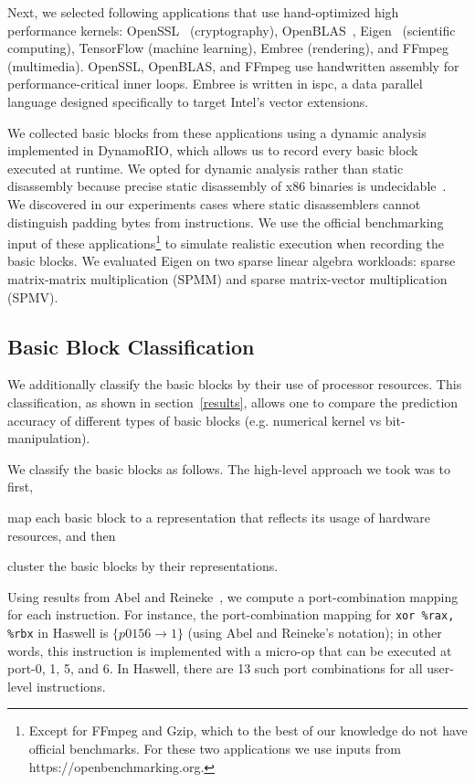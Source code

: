 Next, we selected following applications that use hand-optimized high performance kernels:
OpenSSL~\cite{openssl} (cryptography), OpenBLAS~\cite{openblas}, Eigen~\cite{eigen} (scientific computing),
TensorFlow\cite{tensorflow} (machine learning),
Embree\cite{embree} (rendering), and FFmpeg (multimedia).
OpenSSL, OpenBLAS, and FFmpeg use handwritten assembly for performance-critical inner loops.
Embree is written in ispc\cite{ispc}, a data parallel language
designed specifically to target Intel's vector extensions.

We collected basic blocks from these applications using
a dynamic analysis implemented in DynamoRIO\cite{dynamorio},
which allows us to record every basic block
executed at runtime.
We opted for dynamic analysis rather than static disassembly
because precise static disassembly of x86 binaries
is undecidable~\cite{disassembly-undecidable}.
We discovered in our experiments cases where
static disassemblers cannot distinguish padding bytes from instructions.
We use the official benchmarking input of these applications\footnote{
Except for FFmpeg and Gzip, which to the best of our knowledge do not have
official benchmarks. For these two applications we use inputs
from https://openbenchmarking.org.
} to simulate realistic execution when recording the basic blocks.
We evaluated Eigen on two sparse linear algebra workloads:
sparse matrix-matrix multiplication (SPMM) and 
sparse matrix-vector multiplication (SPMV).

\subsection{Basic Block Classification}\label{classification}
We additionally classify the basic blocks by their use of processor resources.
This classification, as shown in section~\ref{results},
allows one to compare the prediction accuracy of different types of basic blocks 
(e.g. numerical kernel vs bit-manipulation).

We classify the basic blocks as follows.
The high-level approach we took was to first,
\begin{enumerate*}
\item map each basic block to a representation
that reflects its usage of hardware resources, and then
\item cluster the basic blocks by their representations.
\end{enumerate*}

Using results from Abel and Reineke~\cite{uops},
we compute a port-combination mapping for each instruction.
For instance,
the port-combination mapping for \verb|xor %rax, %rbx| in Haswell
is $\{ p0156 \rightarrow 1 \}$ (using Abel and Reineke's notation);
in other words, this instruction is implemented 
with a micro-op that can be executed at port-0, 1, 5, and 6.
In Haswell, there are 13 such port combinations for all user-level instructions.

